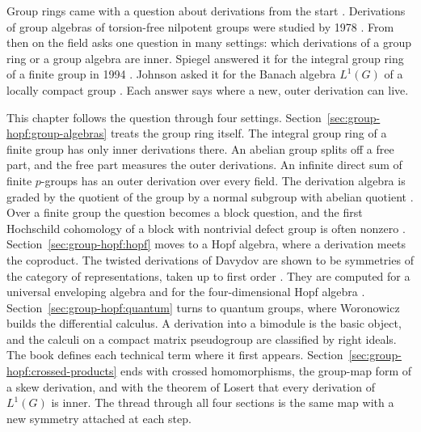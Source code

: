 Group rings came with a question about derivations from the start
\cite[p.~434]{FerreroGiambrunoPolcinoMilies1995}. Derivations of group algebras
of torsion-free nilpotent groups were studied by 1978
\cite[p.~434]{FerreroGiambrunoPolcinoMilies1995}. From then on the field asks one
question in many settings: which derivations of a group ring or a group algebra are
inner. Spiegel answered it for the integral group ring of a finite group in 1994
\cite[p.~2955]{Spiegel1994}. Johnson asked it for the Banach algebra $L^{1}(G)$ of
a locally compact group \cite[p.~221]{Losert2008}. Each answer says where a new,
outer derivation can live.

This chapter follows the question through four settings.
Section~\ref{sec:group-hopf:group-algebras} treats the group ring itself. The
integral group ring of a finite group has only inner derivations there. An
abelian group splits off a free part, and the free part measures the outer
derivations. An infinite direct sum of finite $p$-groups has an outer
derivation over every field. The derivation algebra is graded by the quotient
of the group by a normal subgroup with abelian quotient \cite[Theorem~1,
pp.~1, 8]{ArutyunovZhiltsov2023}. Over a finite group the question becomes a
block question, and the first Hochschild cohomology of a block with nontrivial
defect group is often nonzero \cite[Theorem~A,
p.~2]{AntrobusBriggsRubioDegrassi2026}. Section~\ref{sec:group-hopf:hopf}
moves to a Hopf algebra, where a derivation meets the coproduct. The twisted
derivations of Davydov are shown to be symmetries of the category of
representations, taken up to first order \cite{Davydov2013}. They are computed
for a universal enveloping algebra and for the four-dimensional Hopf algebra
\cite{Davydov2013}.
Section~\ref{sec:group-hopf:quantum} turns to quantum groups, where Woronowicz
builds the differential calculus. A derivation into a bimodule is the basic
object, and the calculi on a compact matrix pseudogroup are classified by
right ideals. The book defines each technical term where it first appears.
Section~\ref{sec:group-hopf:crossed-products} ends with crossed homomorphisms,
the group-map form of a skew derivation, and with the theorem of Losert that
every derivation of $L^{1}(G)$ is inner. The thread through all four sections
is the same map with a new symmetry attached at each step.


